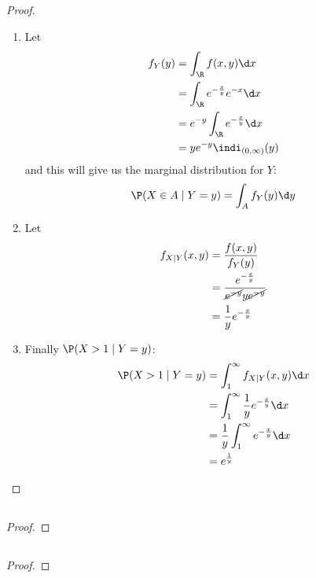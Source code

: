 \subsection{}
\begin{proof}
	\begin{enumerate}
		\item Let
		\begin{align*}
			f_Y(y) &= \int_{\R} f(x,y) \d x\\
			&= \int_{\R} e^{- \frac{x}{y}}e^{-x}\d x\\
			&= e^{-y}\int_{\R} e^{-\frac{x}{y}} \d x\\
			&= y e^{-y}\indi_{(0,\infty)}(y) %
		\end{align*}
		and this will give us the marginal distribution for $Y$:
		\[
			\P(X\in A \mid Y=y) = \int_A f_Y(y)\d y
		\]
		\item Let
		\begin{align*}
			f_{X\mid Y}(x,y) &= \frac{f(x,y)}{f_Y(y)}\\
			&= \frac{e^{-\frac{x}{y}}}{\cancel{e^{-y}}{y\cancel{e^{-y}}}}\\
			&= \frac{1}{y}e^{-\frac{x}{y}}
		\end{align*}
		\item Finally $\P(X>1 \mid Y=y)$:
		\begin{align*}
			\P(X>1\mid Y=y) &= \int_1^{\infty} f_{X\mid Y}(x,y)\d x\\
			&= \int_1^{\infty} \frac{1}{y} e^{-\frac{x}{y}}\d x\\
			&= \frac{1}{y} \int_1^{\infty} e^{-\frac{x}{y}} \d x\\
			&= e^{\frac{1}{y}}
		\end{align*}
	\end{enumerate}
\end{proof}
\subsection{}
\begin{proof}
	
\end{proof}

\subsection{}
\begin{proof}
	
\end{proof}

%	
